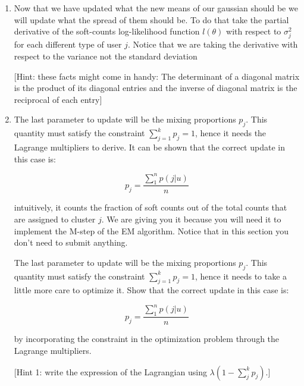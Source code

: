 \begin{enumerate}
\begin{enumerate}
\begin{enumerate}
\item Now that we have updated what the new means of our gaussian should be we will update what the spread of them should be.
To do that take the partial derivative of the soft-counts log-likelihood function $l(\theta)$ with respect to $ \sigma^2_{j} $ for each different type of user $j$.
Notice that we are taking the derivative with respect to the variance not the standard deviation

[Hint: these facts might come in handy: The determinant of a diagonal matrix is the product of its diagonal entries and the inverse of diagonal matrix is the reciprocal of each entry]

\item
The last parameter to update will be the mixing proportions $p_j$. This quantity must satisfy the constraint $ \sum^{k}_{j=1} p_j = 1$, hence it needs the Lagrange multipliers to derive. It can be shown that the correct update in this case is:

$$ p_j = \frac{\sum^{n}_{1} p(j|u)}{n}$$

intuitively, it counts the fraction of soft counts out of the total counts that are assigned to cluster $j$. We are giving you it because you will need it to implement the M-step of the EM algorithm. Notice that in this section you don't need to submit anything. 
 
  The last parameter to update will be the mixing proportions $p_j$. This quantity must satisfy the constraint $ \sum^{k}_{j=1} p_j = 1$, hence it needs to take a little more care to optimize it. Show that the correct update in this case is:

$$ p_j = \frac{\sum^{n}_{1} p(j|u)}{n}$$

by incorporating the constraint in the optimization problem through the Lagrange multipliers.

[Hint 1: write the expression of the Lagrangian using $ \lambda (1 -\sum^{k}_{j} p_j) $.]


\end{enumerate}
\end{enumerate}
\end{enumerate}
